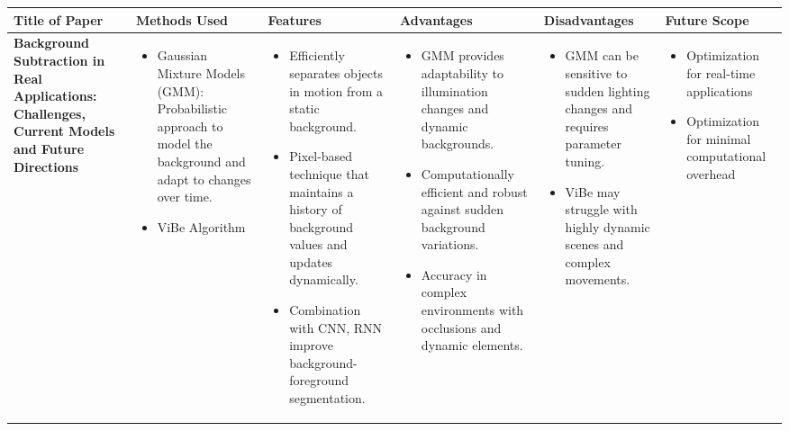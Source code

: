 \documentclass{article}
\begin{document}
\begin{adjustbox}{width=\textwidth}
\begin{tabular} {|p{}|p{}|p{}|p{}|p{}|p{}|}
    \hline
    \rowcolor[HTML]{D3D3D3}
    \textbf{Title of Paper} & \textbf{Methods Used} & \textbf{Features} & \textbf{Advantages} & \textbf{Disadvantages} & \textbf{Future Scope} 
    \\
    \hline
     \vspace{0.1in}
      \large \textbf{Background Subtraction in Real Applications: Challenges, Current Models and Future Directions} & 
    \begin{itemize}[leftmargin=*]
        \item {Gaussian Mixture Models (GMM)}: Probabilistic approach to model the background and adapt to changes over time.
        \item ViBe Algorithm
    \end{itemize} & 
    \begin{itemize}[leftmargin=*]
        \item Efficiently separates objects in motion from a static background.
        \item Pixel-based technique that maintains a history of background values and updates dynamically.
        \item Combination with CNN, RNN improve background-foreground segmentation.
    \end{itemize} & 
    \begin{itemize}[leftmargin=*]
        \item GMM provides adaptability to illumination changes and dynamic backgrounds.
        \item Computationally efficient and robust against sudden background variations.
        \item Accuracy in complex environments with occlusions and dynamic elements.
    \end{itemize} & 
    \begin{itemize}[leftmargin=*]
        \item  GMM can be sensitive to sudden lighting changes and requires parameter tuning.
        \item ViBe may struggle with highly dynamic scenes and complex movements.
    \end{itemize} & 
    \begin{itemize}[leftmargin=*]
        \item  Optimization for real-time applications 
        \item  Optimization for minimal computational overhead
    \end{itemize} \\


\end{tabular}
\end{adjustbox}
\end{document}
